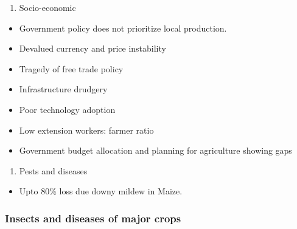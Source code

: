 \documentclass[
  openany]{book}
\providecommand{\tightlist}{%
  \setlength{\itemsep}{0pt}\setlength{\parskip}{0pt}}
\begin{document}
\begin{enumerate}
\def\labelenumi{\arabic{enumi}.}
\setcounter{enumi}{4}
\tightlist
\item
  Socio-economic
\end{enumerate}

\begin{itemize}
\tightlist
\item
  Government policy does not prioritize local production.
\item
  Devalued currency and price instability
\item
  Tragedy of free trade policy
\item
  Infrastructure drudgery
\item
  Poor technology adoption
\item
  Low extension workers: farmer ratio
\item
  Government budget allocation and planning for agriculture showing gaps
\end{itemize}

\begin{enumerate}
\def\labelenumi{\arabic{enumi}.}
\setcounter{enumi}{5}
\tightlist
\item
  Pests and diseases
\end{enumerate}

\begin{itemize}
\tightlist
\item
  Upto 80\% loss due downy mildew in Maize.
\end{itemize}

\hypertarget{insects-and-diseases-of-major-crops}{%
\subsubsection{Insects and diseases of major crops}\label{insects-and-diseases-of-major-crops}}
\end{document}

